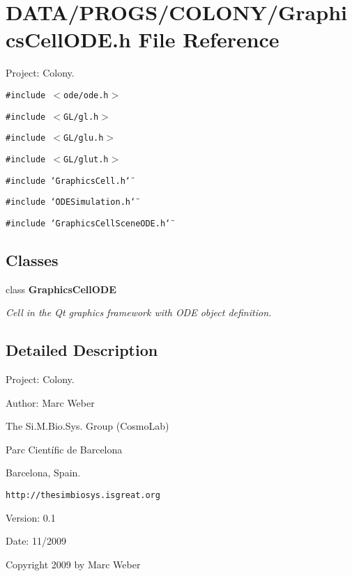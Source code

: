 \section{DATA/PROGS/COLONY/GraphicsCellODE.h File Reference}
\label{GraphicsCellODE_8h}
Project: Colony. 

{\tt \#include $<$ode/ode.h$>$}\par
{\tt \#include $<$GL/gl.h$>$}\par
{\tt \#include $<$GL/glu.h$>$}\par
{\tt \#include $<$GL/glut.h$>$}\par
{\tt \#include \char`\"{}GraphicsCell.h\char`\"{}}\par
{\tt \#include \char`\"{}ODESimulation.h\char`\"{}}\par
{\tt \#include \char`\"{}GraphicsCellSceneODE.h\char`\"{}}\par
\subsection*{Classes}
\begin{CompactItemize}
\item 
class {\bf GraphicsCellODE}
\begin{CompactList}\small\item\em Cell in the Qt graphics framework with ODE object definition. \item\end{CompactList}\end{CompactItemize}


\subsection{Detailed Description}
Project: Colony. 

\begin{Desc}
\item[Author:]Marc Weber\par
 The Si.M.Bio.Sys. Group (CosmoLab)\par
 Parc Científic de Barcelona\par
 Barcelona, Spain.\par
 {\tt http://thesimbiosys.isgreat.org} \end{Desc}
\begin{Desc}
\item[Version:]0.1 \end{Desc}
\begin{Desc}
\item[Date:]11/2009\end{Desc}
Copyright 2009 by Marc Weber 